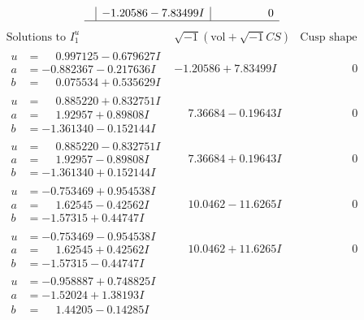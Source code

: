 \documentclass[1p]{elsarticle_modified}
\theoremstyle{definition}
\newcommand{\I}{\sqrt{-1}}
\begin{document}
$$\begin{array}{c|c|c}
 & -1.20586 - 7.83499 I & \phantom{-0.000000 } 0\\
 \hline 
 \end{array}$$\newpage$$\begin{array}{c|c|c}  
\text{Solutions to }I^u_{1}& \I (\text{vol} + \sqrt{-1}CS) & \text{Cusp shape}\\
 \hline 
\begin{aligned}
u &= \phantom{-}0.997125 - 0.679627 I \\
a &= -0.882367 - 0.217636 I \\
b &= \phantom{-}0.075534 + 0.535629 I\end{aligned}
 & -1.20586 + 7.83499 I & \phantom{-0.000000 } 0 \\ \hline\begin{aligned}
u &= \phantom{-}0.885220 + 0.832751 I \\
a &= \phantom{-}1.92957 + 0.89808 I \\
b &= -1.361340 - 0.152144 I\end{aligned}
 & \phantom{-}7.36684 - 0.19643 I & \phantom{-0.000000 } 0 \\ \hline\begin{aligned}
u &= \phantom{-}0.885220 - 0.832751 I \\
a &= \phantom{-}1.92957 - 0.89808 I \\
b &= -1.361340 + 0.152144 I\end{aligned}
 & \phantom{-}7.36684 + 0.19643 I & \phantom{-0.000000 } 0 \\ \hline\begin{aligned}
u &= -0.753469 + 0.954538 I \\
a &= \phantom{-}1.62545 - 0.42562 I \\
b &= -1.57315 + 0.44747 I\end{aligned}
 & \phantom{-}10.0462 - 11.6265 I & \phantom{-0.000000 } 0 \\ \hline\begin{aligned}
u &= -0.753469 - 0.954538 I \\
a &= \phantom{-}1.62545 + 0.42562 I \\
b &= -1.57315 - 0.44747 I\end{aligned}
 & \phantom{-}10.0462 + 11.6265 I & \phantom{-0.000000 } 0 \\ \hline\begin{aligned}
u &= -0.958887 + 0.748825 I \\
a &= -1.52024 + 1.38193 I \\
b &= \phantom{-}1.44205 - 0.14285 I\end{aligned}

\end{array}$$
\end{document}
